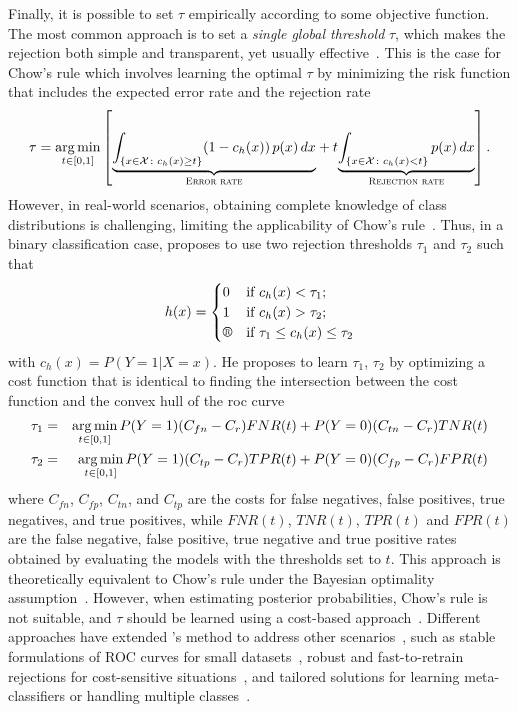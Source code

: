 Finally, it is possible to set $\tau$ empirically according to some objective function. 
The most common approach is to set a \emph{single global threshold} $\tau$, which makes the rejection both simple and transparent, yet usually effective~\citep{Fukunaga1972}. 
This is the case for Chow's rule \citep{Chow1970a} which involves learning the optimal $\tau$ by minimizing the risk function that includes the expected error rate and the rejection rate
\begin{equation}\label{eq:chows_minimumrisk_rule}
    \tau = \operatorname*{arg\,min}_{t\in[0,1]} \left[{\underbrace{\int_{\{x \in \mathcal{X} \colon c_h(x) \ge t\}} (1 - c_h(x)) \, p(x) \, dx}_{\textsc{Error rate}}} + t {\underbrace{\int_{\{x \in \mathcal{X} \colon c_h(x) < t\}} p(x) \, dx}_{\textsc{Rejection rate}}}\right].
\end{equation}
However, in real-world scenarios, obtaining complete knowledge of class distributions is challenging, limiting the applicability of Chow's rule~\citep{Shekhar2019}. 
Thus, in a binary classification case, \citet{Tortorella2000} proposes to use two rejection thresholds $\tau_1$ and $\tau_2$ such that
\begin{equation}
h(x) = 
\begin{cases}
0 & \text{if } c_h(x) < \tau_1; \\
1  & \text{if } c_h(x) > \tau_2; \\
\rr{} & \text{if } \tau_1 \le c_h(x) \le \tau_2
\end{cases}
\end{equation}
with $c_h(x) = P(Y=1|X=x)$.
He proposes to learn $\tau_1$, $\tau_2$ by optimizing a cost function that is identical to finding the intersection between  the cost function and the convex hull of the \gls{roc} curve
\begin{eqnarray}
    \tau_1 &=& \operatorname*{arg\,min}_{t \in [0,1]} P(Y = 1) (C_{fn} - C_r) FNR(t) + P(Y=0) (C_{tn}-C_r) TNR(t)\\
    \tau_2 &=& \operatorname*{arg\,min}_{t \in [0,1]} P(Y=1) (C_{tp} - C_r) TPR(t) + P(Y=0) (C_{fp} - C_r) FPR(t)
\end{eqnarray}
where $C_{fn}$, $C_{fp}$, $C_{tn}$, and $C_{tp}$ are the costs for false negatives, false positives, true negatives, and true positives, while $FNR(t)$, $TNR(t)$, $TPR(t)$ and $FPR(t)$ are the false negative, false positive, true negative and true positive rates obtained by evaluating the models with the thresholds set to $t$.
This approach is theoretically equivalent to Chow's rule under the Bayesian optimality assumption~\citep{Santos-Pereira2005,Du2010}. However, when estimating posterior probabilities, Chow's rule is not suitable, and $\tau$ should be learned using a cost-based approach~\citep{Marrocco2007,Kotropoulos2009}.
Different approaches have extended \citeauthor{Tortorella2000}'s method to address other scenarios~\citep{SANSONE2001}, such as stable formulations of ROC curves for small datasets~\citep{Jigang2006}, robust and fast-to-retrain rejections for cost-sensitive situations~\citep{Dubos2016,Fischer2015}, and tailored solutions for learning meta-classifiers or handling multiple classes~\citep{Pietraszek2007,Cecotti2013}.

